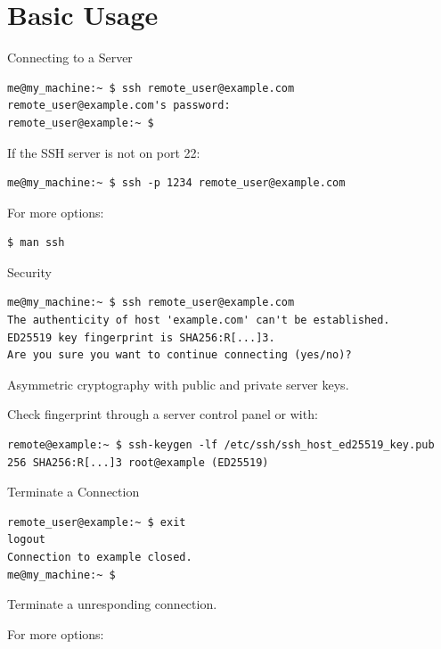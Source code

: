 \documentclass[10pt,graphics,aspectratio=169,table]{beamer}
\begin{document}
\section{Basic Usage}
\begin{frame}[fragile]{Connecting to a Server}
	\begin{lstlisting}
me@my_machine:~ $ ssh remote_user@example.com
remote_user@example.com's password:
remote_user@example:~ $
	\end{lstlisting}

	If the SSH server is not on port 22:
	\begin{lstlisting}
me@my_machine:~ $ ssh -p 1234 remote_user@example.com
	\end{lstlisting}

	For more options:
	\begin{lstlisting}
$ man ssh
	\end{lstlisting}
\end{frame}

\begin{frame}[fragile]{Security}
	\begin{lstlisting}
me@my_machine:~ $ ssh remote_user@example.com
The authenticity of host 'example.com' can't be established.
ED25519 key fingerprint is SHA256:R[...]3.
Are you sure you want to continue connecting (yes/no)?
	\end{lstlisting}
	
	Asymmetric cryptography with public and private server keys.
	
	Check fingerprint through a server control panel or with:
	\begin{lstlisting}
remote@example:~ $ ssh-keygen -lf /etc/ssh/ssh_host_ed25519_key.pub
256 SHA256:R[...]3 root@example (ED25519)
	\end{lstlisting}
\end{frame}

\begin{frame}[fragile]{Terminate a Connection}
	\begin{lstlisting}
remote_user@example:~ $ exit
logout
Connection to example closed.
me@my_machine:~ $
	\end{lstlisting}
	
	Terminate a unresponding connection. \\
	\keys{\return} \keys{$\sim$} 
	
	For more options: \\
	\keys{\return} \keys{$\sim$} 
\end{frame}
\end{document}
